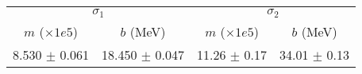 \begin{tabular}{cc|cc}
\multicolumn{2}{c|}{$\sigma_1$} & \multicolumn{2}{|c}{$\sigma_2$} \\
$m$ ($\times1e5$) & $b$ (MeV) & $m$ ($\times1e5$) & $b$ (MeV) \\
\hline
8.530 $\pm$ 0.061 & 18.450 $\pm$ 0.047 & 11.26 $\pm$ 0.17 & 34.01 $\pm$ 0.13\\
\end{tabular}
